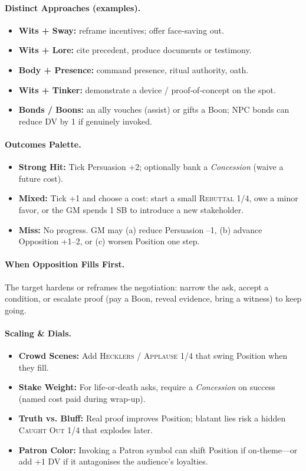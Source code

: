 \paragraph{Distinct Approaches (examples).}
\begin{itemize}
    \item \textbf{Wits + Sway:} reframe incentives; offer face‑saving out.
    \item \textbf{Wits + Lore:} cite precedent, produce documents or testimony.
    \item \textbf{Body + Presence:} command presence, ritual authority, oath.
    \item \textbf{Wits + Tinker:} demonstrate a device / proof‑of‑concept on the spot.
    \item \textbf{Bonds / Boons:} an ally vouches (assist) or gifts a Boon; NPC bonds can reduce DV by 1 if genuinely invoked.
\end{itemize}

\paragraph{Outcomes Palette.}
\begin{itemize}
    \item \textbf{Strong Hit:} Tick Persuasion +2; optionally bank a \emph{Concession} (waive a future cost).
    \item \textbf{Mixed:} Tick +1 and choose a cost: start a small \textsc{Rebuttal 1/4}, owe a minor favor, or the GM spends 1 SB to introduce a new stakeholder.
    \item \textbf{Miss:} No progress. GM may (a) reduce Persuasion --1, (b) advance Opposition +1--2, or (c) worsen Position one step.
\end{itemize}

\paragraph{When Opposition Fills First.}
The target hardens or reframes the negotiation: narrow the ask, accept a condition, or escalate proof (pay a Boon, reveal evidence, bring a witness) to keep going.

\paragraph{Scaling \& Dials.}
\begin{itemize}
    \item \textbf{Crowd Scenes:} Add \textsc{Hecklers} / \textsc{Applause} 1/4 that swing Position when they fill.
    \item \textbf{Stake Weight:} For life‑or‑death asks, require a \emph{Concession} on success (named cost paid during wrap‑up).
    \item \textbf{Truth vs. Bluff:} Real proof improves Position; blatant lies risk a hidden \textsc{Caught Out} 1/4 that explodes later.
    \item \textbf{Patron Color:} Invoking a Patron symbol can shift Position if on‑theme---or add +1 DV if it antagonises the audience's loyalties.
\end{itemize}

